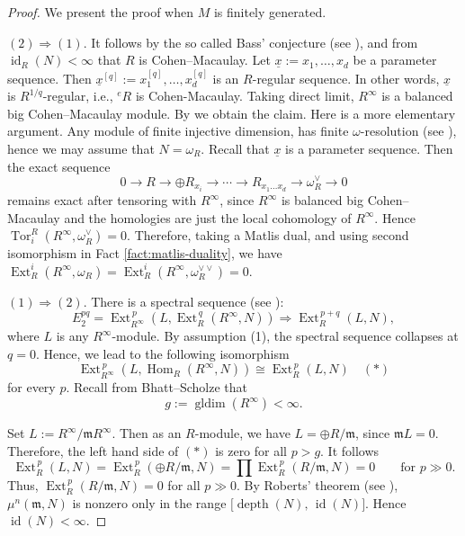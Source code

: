 \documentclass[11pt,a4paper]{amsart}
\numberwithin{equation}{section}
\theoremstyle{definition}
\theoremstyle{remark}
\newcommand{\fm}{\mathfrak{m}}
\begin{document}
\begin{proof} We present the proof when $M$ is finitely generated.
	
	\noindent
	$(2)\Rightarrow(1)$.
	It follows by the so called Bass' conjecture (see \cite[9.6.2]{BH}), and   from $
	\operatorname{id}_R(N)<\infty
	$ that $R$ is Cohen--Macaulay. Let $\underline{x}:=x_1,\ldots, x_d$ be a parameter sequence. Then $\underline{x}^{[q]}:=x_1^{[q]},\ldots, x_d^{[q]}$ is an $R$-regular sequence. In other words, $\underline{x}$ is $R^{1/q}$-regular, i.e., ${}^e R$ is Cohen-Macaulay. Taking direct limit,
  $R^\infty$ is a balanced big Cohen--Macaulay module.
	By \cite[Corollary~7.7]{sim} we obtain the claim.
Here is a more elementary argument.
	Any module of finite injective dimension,  has finite $\omega$-resolution (see \cite[3.3.28(b)]{BH}), hence we may assume
	that
$
	N=\omega_R .
$
Recall that $\underline{x}$ is a parameter sequence.	Then the exact sequence
	\[
	0\longrightarrow
	R 
	\longrightarrow \oplus R_{x_i}
\longrightarrow
	\cdots
	\longrightarrow
	R_{x_1\ldots x_d}
	\longrightarrow
	\omega_R^\vee
	\longrightarrow
	0
	\]
	remains exact after tensoring with $R^\infty$, since $R^\infty$ is balanced
	big Cohen--Macaulay and the homologies are just the local cohomology of $R^\infty$. Hence
$
	\operatorname{Tor}_i^R(R^\infty,\omega_R^\vee)=0.
$
	Therefore, taking a Matlis dual, and using second isomorphism in  Fact \ref{fact:matlis-duality}, we have
$
	\operatorname{Ext}_R^i(R^\infty,\omega_R)	=\operatorname{Ext}_R^i(R^\infty,\omega_R^{\vee\vee})=0.
$
	

	
	\noindent
	$(1)\Rightarrow(2)$.
	There is a spectral sequence (see \cite[Theorem 10.74]{Rot}):
	\[
	E_2^{pq}
	=
	\operatorname{Ext}_{R^\infty}^{\,p}
	\!\left(
	L,
	\operatorname{Ext}_R^{\,q}(R^\infty,N)
	\right)
	\Longrightarrow
	\operatorname{Ext}_R^{\,p+q}(L,N),
	\]
	where $L$ is any $R^\infty$-module.
	By assumption (1), the spectral sequence collapses at $q=0$.
	Hence, we lead to the following isomorphism
	\[
	\operatorname{Ext}_{R^\infty}^{\,p}
	(L,\operatorname{Hom}_R(R^\infty,N))
	\cong
	\operatorname{Ext}_R^{\,p}(L,N)
\quad(\ast)	\]
	for every $p$.
		Recall from  Bhatt--Scholze \cite{BS1} that
	\[
	g:=\operatorname{gldim}(R^\infty)<\infty.
	\]

Set $L:=R^\infty/\fm R^\infty$. Then as an $R$-module, we have $L=\oplus R /\fm $, since $\fm L=0$.
	Therefore, the left hand side of $ (\ast)$ is zero for all $p>g$. It follows
	\[
	\operatorname{Ext}_R^{\,p}(L,N)=	\operatorname{Ext}_R^{\,p}(\oplus R /\fm ,N)=\prod \operatorname{Ext}_R^{\,p}(  R /\fm ,N)=0
	\qquad\text{for } p\gg0.
	\] Thus, 	$
  \operatorname{Ext}_R^{\,p}(  R /\fm ,N)=0
$  {for all} $p\gg0$.
 	By Roberts' theorem (see \cite[Theorem 2]{Ro2}), $\mu^n(\mathfrak m,N)$ is nonzero only in the range
$
	\bigl[\operatorname{depth}(N),\,\operatorname{id}(N)\bigr].
$
	Hence
$
	\operatorname{id}(N)<\infty.
$
\end{proof}
	
\end{document}
